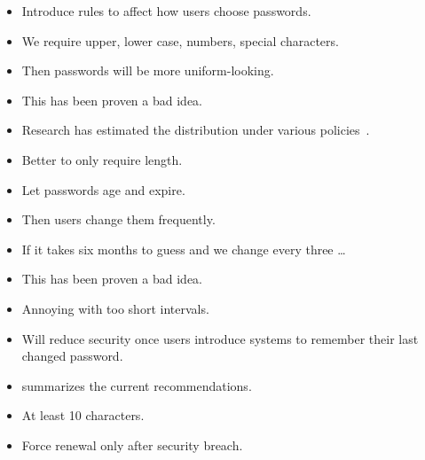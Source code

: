 \begin{frame}
  \begin{idea}
    \begin{itemize}
      \item Introduce rules to affect how users choose passwords.
      \item We require upper, lower case, numbers, special characters.
      \item Then passwords will be more uniform-looking.
    \end{itemize}
  \end{idea}

  \begin{remark}[Usability]
    \begin{itemize}
      \item This has been proven a bad idea.
      \item Research has estimated the distribution under various 
        policies~\cite{Komanduri2011opa}.
      \item Better to only require length.
    \end{itemize}
  \end{remark}
\end{frame}

\begin{frame}
  \begin{idea}
    \begin{itemize}
      \item Let passwords age and expire.
      \item Then users change them frequently.
      \item If it takes six months to guess and we change every three \dots
    \end{itemize}
  \end{idea}

  \begin{remark}[Usability]
    \begin{itemize}
      \item This has been proven a bad idea.
      \item Annoying with too short intervals.
      \item Will reduce security once users introduce systems to remember their 
        last changed password.
    \end{itemize}
  \end{remark}
\end{frame}

\begin{frame}
  \begin{itemize}
    \item \Textcite{NIST-passwd-guide} summarizes the current recommendations.
    \item At least 10 characters.
    \item Force renewal only after security breach.
  \end{itemize}
\end{frame}


